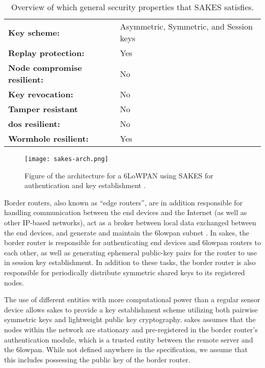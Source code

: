 \begin{table}[h]
\centering
\begin{tabular}{|l|l|} \hline
\textbf{Key scheme:} & Asymmetric, Symmetric, and Session keys  \\
\textbf{Replay protection:}	 & Yes  \\
\textbf{Node compromise resilient:} & No  \\
\textbf{Key revocation:} & No \\
\textbf{Tamper resistant} & No \\
\textbf{\gls{dos} resilient:} & No \\
\textbf{Wormhole resilient:} & Yes \\ \hline
\end{tabular}
\caption{Overview of which general security properties that SAKES satisfies.}
\label{tab:sakes-props}
\end{table}


\begin{figure}[h]
	\centering
	\texttt{[image: sakes-arch.png]}
	\caption[Figure of the architecture for a 6LoWPAN using SAKES for authentication and key establishment.]{Figure of the architecture for a 6LoWPAN using SAKES for authentication and key establishment \cite{hussen2013sakes}.}
	\label{fig:sakes-arch}
\end{figure}


Border routers, also known as ``edge routers'', are in addition responsible for handling communication between the end devices and the Internet (as well as other IP-based networks), act as a broker between local data exchanged between the end devices, and generate and maintain the \gls{6lowpan} subnet \cite{olsson20146lowpan}. In \gls{sakes}, the border router is responsible for authenticating end devices and \gls{6lowpan} routers to each other, as well as generating ephemeral public-key pairs for the router to use in session key establishment. In addition to these tasks, the border router is also responsible for periodically distribute symmetric shared keys to its registered nodes.

The use of different entities with more computational power than a regular sensor device allows \gls{sakes} to provide a key establishment scheme utilizing both pairwise symmetric keys and lightweight public key cryptography. \gls{sakes} assumes that the nodes within the network are stationary and pre-registered in the border router's authentication module, which is a trusted entity between the remote server and the \gls{6lowpan}. While not defined anywhere in the specification, we assume that this includes possessing the public key of the border router. 

